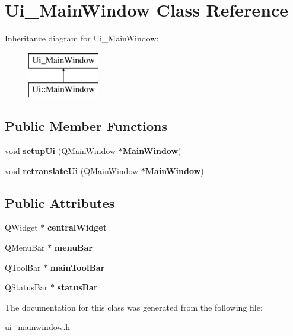 \section{Ui\+\_\+\+Main\+Window Class Reference}
\label{class_ui___main_window}
Inheritance diagram for Ui\+\_\+\+Main\+Window\+:\begin{figure}[H]
\begin{center}
\leavevmode
\includegraphics[height=2.000000cm]{class_ui___main_window}
\end{center}
\end{figure}
\subsection*{Public Member Functions}
\begin{DoxyCompactItemize}
\item 
void {\bfseries setup\+Ui} (Q\+Main\+Window $\ast${\bf Main\+Window})\label{class_ui___main_window_acf4a0872c4c77d8f43a2ec66ed849b58}

\item 
void {\bfseries retranslate\+Ui} (Q\+Main\+Window $\ast${\bf Main\+Window})\label{class_ui___main_window_a097dd160c3534a204904cb374412c618}

\end{DoxyCompactItemize}
\subsection*{Public Attributes}
\begin{DoxyCompactItemize}
\item 
Q\+Widget $\ast$ {\bfseries central\+Widget}\label{class_ui___main_window_a30075506c2116c3ed4ff25e07ae75f81}

\item 
Q\+Menu\+Bar $\ast$ {\bfseries menu\+Bar}\label{class_ui___main_window_a2be1c24ec9adfca18e1dcc951931457f}

\item 
Q\+Tool\+Bar $\ast$ {\bfseries main\+Tool\+Bar}\label{class_ui___main_window_a5172877001c8c7b4e0f6de50421867d1}

\item 
Q\+Status\+Bar $\ast$ {\bfseries status\+Bar}\label{class_ui___main_window_a50fa481337604bcc8bf68de18ab16ecd}

\end{DoxyCompactItemize}


The documentation for this class was generated from the following file\+:\begin{DoxyCompactItemize}
\item 
ui\+\_\+mainwindow.\+h\end{DoxyCompactItemize}
